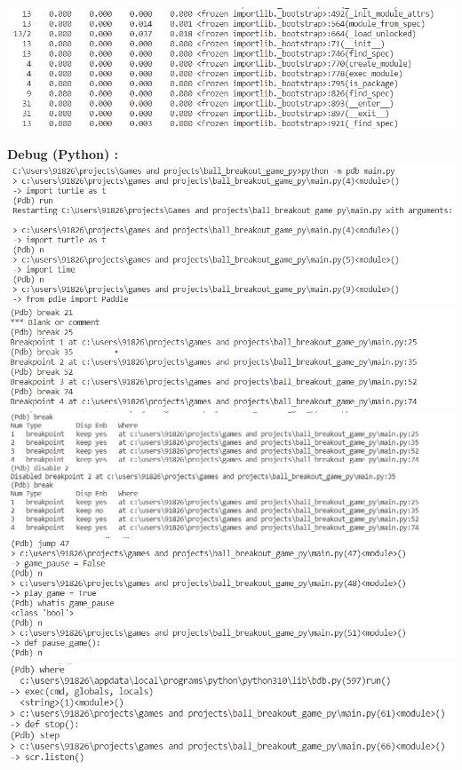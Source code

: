 \documentclass{article}
\begin{document}
\begin{center}{\centering\includegraphics[scale=0.70]{python_ui_prof_02}}\end{center}

\textbf{\bf Debug (Python) : \\}
\includegraphics[scale=0.70]{main_pdb_01}\\
\includegraphics[scale=0.70]{main_pdb_02}\\
\includegraphics[scale=0.70]{main_pdb_03}\\
\includegraphics[scale=0.70]{main_pdb_04}\\
\includegraphics[scale=0.70]{main_pdb_05}\\
\end{document}
